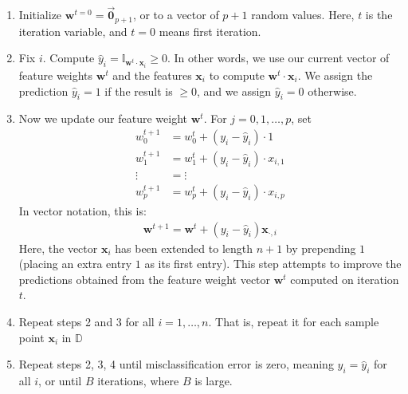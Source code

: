 \documentclass[12pt, a4paper]{article}
\theoremstyle{definition}
\begin{document}
	\begin{enumerate}[label=(\arabic*)]
		\item Initialize $\mathbf{w}^{t=0}=\vec{\mathbf{0}}_{p+1}$, or to a vector
		of $p+1$ random values. Here, $t$ is the iteration variable, and $t=0$ means first
		iteration.
		\item Fix $i$. Compute $\hat{y}_i = \mathbb{I}_{\mathbf{w}^{t}\cdot \mathbf{x}_i}\geq 0$.
		In other words, we use our current vector of feature weights $\mathbf{w}^t$ and
		the features $\mathbf{x}_i$ to compute $\mathbf{w}^t\cdot \mathbf{x}_i$. We assign the
		prediction $\hat{y}_i=1$ if the result is $\geq 0$, and we assign $\hat{y}_i=0$ otherwise.
		\item Now we update our feature weight $\mathbf{w}^t$. For $j=0,1,\ldots,p$, set
		\begin{align*}
			w_0^{t + 1} &= w_0^{t} + (y_i - \hat{y}_i)\cdot 1\\
			w_1^{t + 1} &= w_1^{t} + (y_i - \hat{y}_i)\cdot x_{i, 1}\\
			\vdots &= \vdots\\
			w_p^{t + 1} &= w_p^{t} + (y_i - \hat{y}_i)\cdot x_{i, p}
		\end{align*}
		In vector notation, this is:
		\begin{align*}
			\mathbf{w}^{t + 1} = \mathbf{w}^{t} + (y_i - \hat{y}_i)\mathbf{x}_{\cdot, i}
		\end{align*}
		Here, the vector $\mathbf{x}_i$ has been extended to length $n+1$ by prepending $1$
		(placing an extra entry $1$ as its first entry). This step attempts to improve the
		predictions obtained from the feature weight vector $\mathbf{w}^t$ computed
		on iteration $t$.
		\item Repeat steps 2 and 3 for all $i=1,\ldots,n$. That is, repeat it for each
		sample point $\mathbf{x}_i$ in $\mathbb{D}$
		\item Repeat steps 2, 3, 4 until misclassification error is zero, meaning $y_i=\hat{y}_i$
		for all $i$, or until $B$ iterations, where $B$ is large.
	\end{enumerate}
\end{document}
